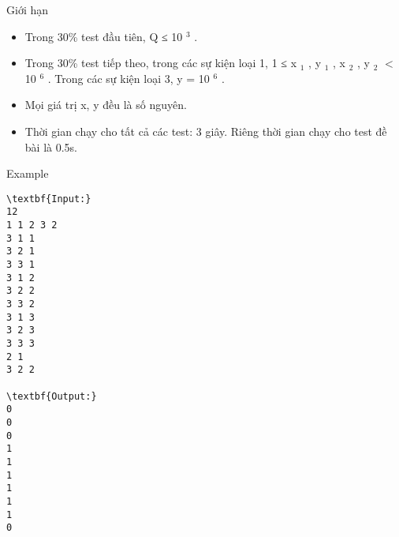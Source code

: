 Giới hạn
\begin{itemize}
	\item Trong 30\% test đầu tiên, Q ≤ 10 $^ 3 $ .
	\item Trong 30\% test tiếp theo, trong các sự kiện loại 1, 1 ≤ x $_ 1 $ , y $_ 1 $ , x $_ 2 $ , y $_ 2 $ $<$ 10 $^ 6 $ . Trong các sự kiện loại 3, y = 10 $^ 6 $ .
	\item Mọi giá trị x, y đều là số nguyên.
	\item Thời gian chạy cho tất cả các test: 3 giây. Riêng thời gian chạy cho test đề bài là 0.5s.
\end{itemize}
Example
\begin{verbatim}
\textbf{Input:}
12
1 1 2 3 2
3 1 1
3 2 1
3 3 1
3 1 2
3 2 2
3 3 2
3 1 3
3 2 3
3 3 3
2 1
3 2 2

\textbf{Output:}
0
0
0
1
1
1
1
1
1
0
\end{verbatim}
